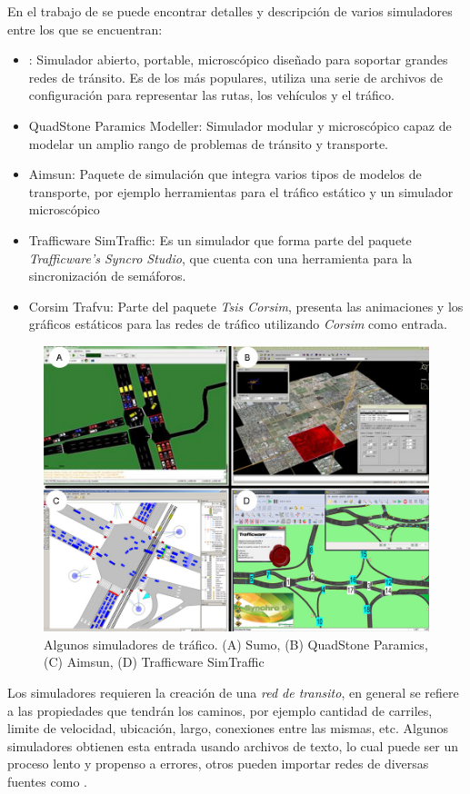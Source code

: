 En el trabajo de \citet{review_trafico} se puede encontrar detalles y descripción de varios simuladores entre los que se encuentran:
\begin{itemize}
	\item \citet{SUMO}: Simulador abierto, portable, microscópico diseñado para soportar grandes redes de tránsito. Es de los más populares, utiliza una serie de archivos de configuración para representar las rutas, los vehículos y el tráfico.
	\item QuadStone Paramics Modeller: Simulador modular y microscópico capaz de modelar un amplio rango de problemas de tránsito y transporte.
	\item Aimsun: Paquete de simulación que integra varios tipos de modelos de transporte, por ejemplo herramientas para el tráfico estático y un simulador microscópico
	\item Trafficware SimTraffic: Es un simulador que forma parte del paquete \emph{Trafficware's Syncro Studio}, que cuenta con una herramienta para la sincronización de semáforos.
	\item Corsim Trafvu: Parte del paquete \emph{Tsis Corsim}, presenta las animaciones y los gráficos estáticos para las redes de tráfico utilizando \emph{Corsim} como entrada.
\end{itemize}


\begin{figure}[H]
	\centering
	\includegraphics[width=0.9\linewidth]{Figures/simuladores}
	\caption[]{Algunos simuladores de tráfico. (A) Sumo, (B) QuadStone Paramics, (C) Aimsun, (D) Trafficware SimTraffic}
	\label{fig:simuladores}
\end{figure}

Los simuladores requieren la creación de una \emph{red de transito}, en general se refiere a las propiedades que tendrán los caminos, por ejemplo cantidad de carriles, limite de velocidad, ubicación, largo, conexiones entre las mismas, etc. Algunos simuladores obtienen esta entrada usando archivos de texto, lo cual puede ser un proceso lento y propenso a errores, otros pueden importar redes de diversas fuentes como \citet{OSM}.

